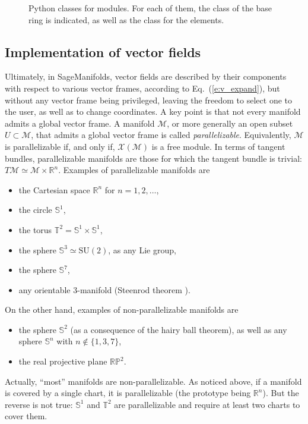 \documentclass[a4paper]{jpconf}
\newcommand{\soft}[1]{\textsf{#1}}
\newcommand{\SM}{\soft{SageManifolds}}
\begin{document}
\begin{figure}
\begin{center}

\end{center}
\caption{\label{f:module_classes} Python classes for modules. For each of them,
the class of the base ring is indicated, as well as
the class for the elements.}
\end{figure}


\subsection{Implementation of vector fields} \label{s:vector_fields}

Ultimately, in \SM{}, vector fields are described by their 
components with respect to various vector frames, according to 
Eq.~(\ref{e:v_expand}), but without any vector frame being privileged, 
leaving the freedom to select one to the user, as well as to change 
coordinates. A key point is that 
not every manifold admits a global vector frame. 
A manifold $\mathcal{M}$, or more generally an open subset $U\subset\mathcal{M}$,
that admits a global vector frame is called 
\emph{parallelizable}. Equivalently,
$\mathcal{M}$ is parallelizable if, and only if, $\mathscr{X}(\mathcal{M})$
is a free module. In terms of tangent bundles, 
parallelizable manifolds are those for which the tangent bundle is trivial:
$T\mathcal{M} \simeq \mathcal{M}\times \mathbb{R}^n$.
Examples of parallelizable manifolds are \cite{Lee13}
\begin{itemize}
\item the Cartesian space $\mathbb{R}^n$ for $n=1,2,\ldots$, 
\item the circle $\mathbb{S}^1$, 
\item the torus $\mathbb{T}^2 = \mathbb{S}^1\times \mathbb{S}^1$, 
\item the sphere $\mathbb{S}^3 \simeq \mathrm{SU}(2)$, as any Lie group, 
\item the sphere $\mathbb{S}^7$, 
\item any orientable 3-manifold (Steenrod theorem \cite{Steen51}).
\end{itemize}
On the other hand, examples of non-parallelizable manifolds are
\begin{itemize}
\item the sphere $\mathbb{S}^2$ (as a consequence of the hairy ball theorem),
as well as any sphere $\mathbb{S}^n$ with $n\not\in\{1,3,7\}$, 
\item the real projective plane $\mathbb{RP}^2$.
\end{itemize}
Actually, ``most'' manifolds are non-parallelizable. 
As noticed above, if a manifold is covered by a single chart, it is 
parallelizable (the prototype being $\mathbb{R}^n$). But the reverse is not 
true: $\mathbb{S}^1$ and $\mathbb{T}^2$ are parallelizable and require 
at least two charts to cover them. 
\end{document}
